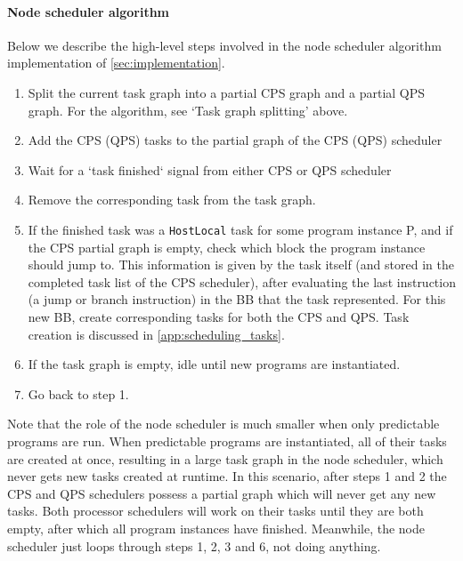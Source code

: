 \paragraph{Node scheduler algorithm}
Below we describe the high-level steps involved in the node scheduler algorithm implementation of \cref{sec:implementation}.
\label{app:node_scheduler_algorithm}
\begin{enumerate}
    \item Split the current task graph into a partial CPS graph and a partial QPS graph. For the algorithm, see `Task graph splitting' above.
    \item Add the CPS (QPS) tasks to the partial graph of the CPS (QPS) scheduler
    \item Wait for a `task finished` signal from either CPS or QPS scheduler
    \item Remove the corresponding task from the task graph.
    \item If the finished task was a \texttt{HostLocal} task for some program instance P, and if the CPS partial graph is empty, check which block the program instance should jump to. This information is given by the task itself (and stored in the completed task list of the CPS scheduler), after evaluating the last instruction (a jump or branch instruction) in the BB that the task represented. For this new BB, create corresponding tasks for both the CPS and QPS. Task creation is discussed in \cref{app:scheduling_tasks}.
    \item If the task graph is empty, idle until new programs are instantiated.
    \item Go back to step 1.
\end{enumerate}

Note that the role of the node scheduler is much smaller when only predictable programs are run.
When predictable programs are instantiated, all of their tasks are created at once, resulting in a large task graph in the node scheduler, which never gets new tasks created at runtime.
In this scenario, after steps 1 and 2 the CPS and QPS schedulers possess a partial graph which will never get any new tasks.
Both processor schedulers will work on their tasks until they are both empty, after which all program instances have finished. Meanwhile, the node scheduler just loops through steps 1, 2, 3 and 6, not doing anything.

